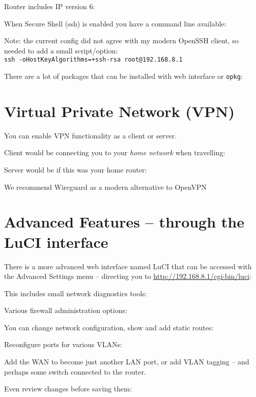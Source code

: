 \documentclass[a4paper,11pt,notitlepage,landscape]{report}
\begin{document}
Router includes IP version 6:
\eject

When Secure Shell (ssh) is enabled you have a command line available:

Note: the current config did not agree with my modern OpenSSH client, so needed to add a small script/option:\\
\verb;ssh -oHostKeyAlgorithms=+ssh-rsa root@192.168.8.1;

\eject


There are a lot of packages that can be installed with web interface or \verb+opkg+:



\eject

\section*{Virtual Private Network (VPN)}

You can enable VPN functionality as a client or server.

Client would be connecting you to your \emph{home network} when travelling:
\eject

Server would be if this was your home router:

We recommend Wireguard as a modern alternative to OpenVPN

\section*{Advanced Features -- through the LuCI interface}

There is a more advanced web interface named LuCI that can be accessed with the Advanced Settings menu -- directing you to \url{http://192.168.8.1/cgi-bin/luci}:

\eject

This includes small network diagnostics tools:

Various firewall administration options:
\eject

You can change network configuration, show and add static routes:
\eject

Reconfigure ports for various VLANs:

Add the WAN to become just another LAN port, or add VLAN tagging -- and perhaps some switch connected to the router.

\eject

Even review changes before saving them:
\end{document}
